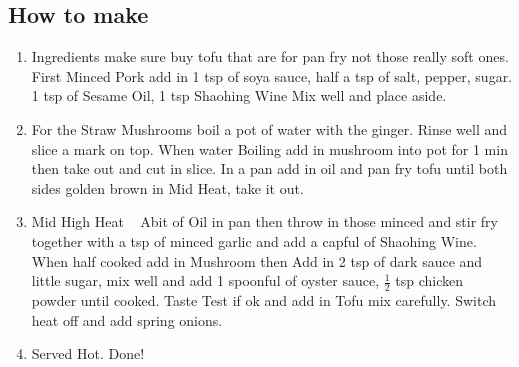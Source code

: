 \subsection{How to make}
\begin{enumerate}
    \item Ingredients make sure buy tofu that are for pan fry not those really soft ones. First Minced Pork add in 1 tsp of soya sauce, half a tsp of salt, pepper, sugar. 1 tsp of Sesame Oil, 1 tsp Shaohing Wine Mix well and place aside.
    \item For the Straw Mushrooms boil a pot of water with the ginger. Rinse well and slice a mark on top. When water Boiling add in mushroom into pot for 1 min then take out and cut in slice. In a pan add in oil and pan fry tofu until both sides golden brown in Mid Heat, take it out.
    \item Mid High Heat ~ Abit of Oil in pan then throw in those minced and stir fry together with a tsp of minced garlic and add a capful of Shaohing Wine. When half cooked add in Mushroom then Add in 2 tsp of dark sauce and little sugar, mix well and add 1 spoonful of oyster sauce, $\frac{1}{2}$ tsp chicken powder until cooked. Taste Test if ok and add in Tofu mix carefully. Switch heat off and add spring onions.
    \item Served Hot. Done!
\end{enumerate}